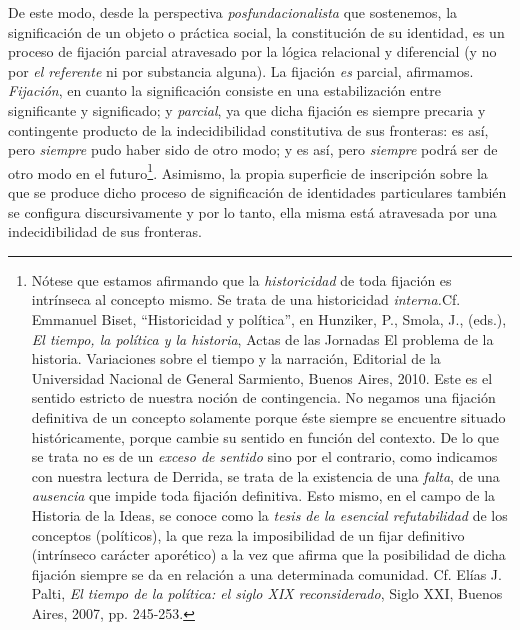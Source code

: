 De este modo, desde la perspectiva \emph{posfundacionalista} que
sostenemos, la significación de un objeto o práctica social, la
constitución de su identidad, es un proceso de fijación parcial
atravesado por la lógica relacional y diferencial (y no por \emph{el
referente} ni por substancia alguna). La fijación \emph{es} parcial,
afirmamos. \emph{Fijación}, en cuanto la significación consiste en una
estabilización entre significante y significado; y \emph{parcial}, ya
que dicha fijación es siempre precaria y contingente producto de la
indecidibilidad constitutiva de sus fronteras: es así, pero
\emph{siempre} pudo haber sido de otro modo; y es así, pero
\emph{siempre} podrá ser de otro modo en el futuro\footnote{Nótese que
  estamos afirmando que la \emph{historicidad} de toda fijación es
  intrínseca al concepto mismo. Se trata de una historicidad
  \emph{interna.}Cf. Emmanuel Biset, \enquote{Historicidad y política}, en
  Hunziker, P., Smola, J., (eds.), \emph{El tiempo, la política y la
  historia}, Actas de las Jornadas El problema de la historia.
  Variaciones sobre el tiempo y la narración, Editorial de la
  Universidad Nacional de General Sarmiento, Buenos Aires, 2010. Este es
  el sentido estricto de nuestra noción de contingencia. No negamos una
  fijación definitiva de un concepto solamente porque éste siempre se
  encuentre situado históricamente, porque cambie su sentido en función
  del contexto. De lo que se trata no es de un \emph{exceso de sentido}
  sino por el contrario, como indicamos con nuestra lectura de Derrida,
  se trata de la existencia de una \emph{falta}, de una \emph{ausencia}
  que impide toda fijación definitiva. Esto mismo, en el campo de la
  Historia de la Ideas, se conoce como la \emph{tesis de la esencial
  refutabilidad} de los conceptos (políticos), la que reza la
  imposibilidad de un fijar definitivo (intrínseco carácter aporético) a
  la vez que afirma que la posibilidad de dicha fijación siempre se da
  en relación a una determinada comunidad. Cf. Elías J. Palti, \emph{El
  tiempo de la política: el siglo XIX reconsiderado}, Siglo XXI, Buenos
  Aires, 2007, pp. 245-253.}. Asimismo, la propia superficie de
inscripción sobre la que se produce dicho proceso de significación de
identidades particulares también se configura discursivamente y por lo
tanto, ella misma está atravesada por una indecidibilidad de sus
fronteras.

